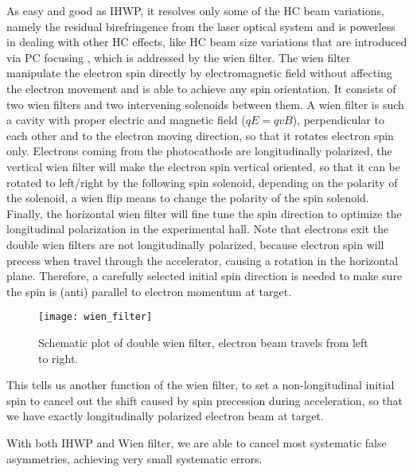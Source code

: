 As easy and good as IHWP, it resolves only some of the HC beam variations, namely
the residual birefringence from the laser optical system and is powerless in dealing
with other HC effects, like HC beam size variations that are introduced via
PC focusing \cite{osti_1059486}, which is addressed by the wien filter.
The wien filter manipulate the electron spin directly by electromagnetic field 
without affecting the electron movement and is able to achieve any spin orientation.
It consists of two wien filters and two intervening solenoids between them.
A wien filter is such a cavity with proper electric and magnetic field ($qE = qvB$), 
perpendicular to each other and to the electron moving direction, so that it 
rotates electron spin only.
Electrons coming from the photocathode are longitudinally polarized,
the vertical wien filter will make the electron spin vertical oriented, so that
it can be rotated to left/right by the following spin solenoid, depending on
the polarity of the solenoid, a wien flip means to change the polarity of the spin solenoid.
Finally, the horizontal wien filter will fine tune the spin direction to optimize 
the longitudinal polarization in the experimental hall. Note that electrons
exit the double wien filters are not longitudinally polarized, because electron
spin will precess when travel through the accelerator, causing a rotation in the
horizontal plane. Therefore, a carefully selected initial spin direction is 
needed to make sure the spin is (anti) parallel to electron momentum at target.
\begin{figure}
    \centering
    \texttt{[image: wien\_filter]}
    \caption{Schematic plot of double wien filter, electron beam travels from left
    to right. \cite{osti_1059486}}
    \label{fig:double_wien_filter}
\end{figure}

This tells us another function of the wien filter, to set a non-longitudinal 
initial spin to cancel out the shift caused by spin precession during acceleration, 
so that we have exactly longitudinally polarized electron beam at target.

With both IHWP and Wien filter, we are able to cancel most systematic false 
asymmetries, achieving very small systematic errors.
\begin{comment}
    IHWP
    \begin{itemize}
	\item Cancels electronic cross talk and Pockels Cell steering
	\item  Residual linear polarization effects do not cancel
	\item Spot size asymmetry, which we cannot measure, does not cancel
    \end{itemize}

    Wine filters and solenoid
    \begin{itemize}
	\item Cancels all helicity-correlated beam asymmetries from Injector including spot size
    \end{itemize}
\end{comment}

